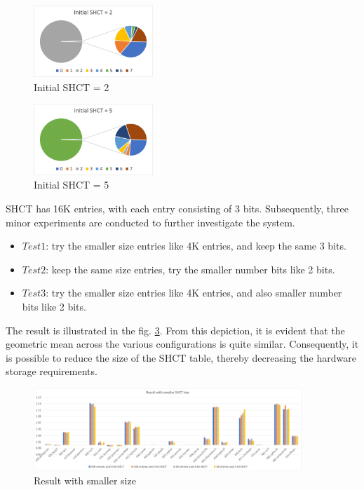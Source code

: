 \begin{figure}[htbp]
\centering
\includegraphics[width=0.4\textwidth]{figs/Picture2.png}
\caption{Initial SHCT = 2}
\label{fig.Picture2}
\end{figure}

\begin{figure}[htbp]
\centering
\includegraphics[width=0.4\textwidth]{figs/Picture3.png}
\caption{Initial SHCT = 5}
\label{fig.Picture3}
\end{figure}

SHCT has 16K entries, with each entry consisting of 3 bits. Subsequently, three minor experiments are conducted to further investigate the system.
\begin{itemize}
    \item \(Test 1\): try the smaller size entries like 4K entries,  and keep the same 3 bits.
    \item \(Test 2\): keep the same size entries, try the smaller number bits like 2 bits.
    \item \(Test 3\): try the smaller size entries like 4K entries, and also smaller number bits like 2 bits.
\end{itemize}
The result is illustrated in the fig. \ref{fig.Figure6}. From this depiction, it is evident that the geometric mean across the various configurations is quite similar. Consequently, it is possible to reduce the size of the SHCT table, thereby decreasing the hardware storage requirements.
\begin{figure}[htbp]
\centering
\includegraphics[width=0.9\textwidth]{figs/Picture6.png}
\caption{Result with smaller size}
\label{fig.Figure6}
\end{figure}